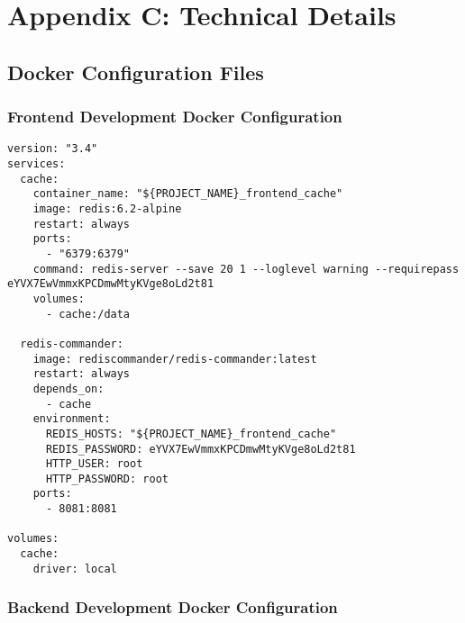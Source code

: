 \appendix
\chapter*{Appendix C: Technical Details}
\label{appendix:technical_details}



\section{Docker Configuration Files}
\label{appendix:docker_configs}

\subsection{Frontend Development Docker Configuration}
\label{appendix:frontend_docker_dev}

\begin{lstlisting}[caption={Frontend Development Docker Configuration}, captionpos=b, breaklines=true]
version: "3.4"
services:
  cache:
    container_name: "${PROJECT_NAME}_frontend_cache"
    image: redis:6.2-alpine
    restart: always
    ports:
      - "6379:6379"
    command: redis-server --save 20 1 --loglevel warning --requirepass eYVX7EwVmmxKPCDmwMtyKVge8oLd2t81
    volumes:
      - cache:/data

  redis-commander:
    image: rediscommander/redis-commander:latest
    restart: always
    depends_on:
      - cache
    environment:
      REDIS_HOSTS: "${PROJECT_NAME}_frontend_cache"
      REDIS_PASSWORD: eYVX7EwVmmxKPCDmwMtyKVge8oLd2t81
      HTTP_USER: root
      HTTP_PASSWORD: root
    ports:
      - 8081:8081

volumes:
  cache:
    driver: local
\end{lstlisting}

\subsection{Backend Development Docker Configuration}
\label{appendix:backend_docker_dev}


